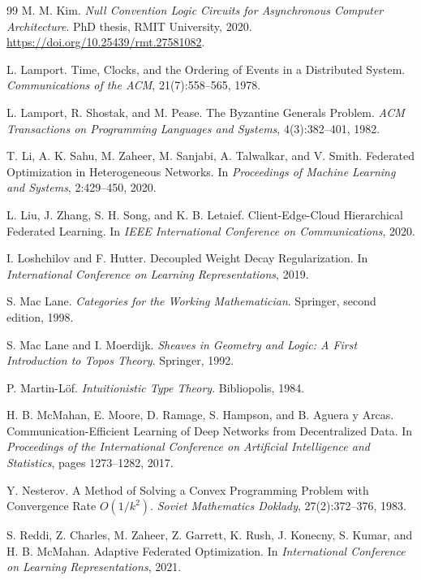 \documentclass[11pt]{article}
\theoremstyle{definition}
\theoremstyle{remark}
\begin{document}
\begin{thebibliography}{99}
M. M. Kim.
\newblock \emph{Null Convention Logic Circuits for Asynchronous Computer Architecture}.
\newblock PhD thesis, RMIT University, 2020.
\newblock \url{https://doi.org/10.25439/rmt.27581082}.

L. Lamport.
\newblock Time, Clocks, and the Ordering of Events in a Distributed System.
\newblock \emph{Communications of the ACM}, 21(7):558--565, 1978.

L. Lamport, R. Shostak, and M. Pease.
\newblock The Byzantine Generals Problem.
\newblock \emph{ACM Transactions on Programming Languages and Systems}, 4(3):382--401, 1982.

T. Li, A. K. Sahu, M. Zaheer, M. Sanjabi, A. Talwalkar, and V. Smith.
\newblock Federated Optimization in Heterogeneous Networks.
\newblock In \emph{Proceedings of Machine Learning and Systems}, 2:429--450, 2020.

L. Liu, J. Zhang, S. H. Song, and K. B. Letaief.
\newblock Client-Edge-Cloud Hierarchical Federated Learning.
\newblock In \emph{IEEE International Conference on Communications}, 2020.

I. Loshchilov and F. Hutter.
\newblock Decoupled Weight Decay Regularization.
\newblock In \emph{International Conference on Learning Representations}, 2019.

S. Mac Lane.
\newblock \emph{Categories for the Working Mathematician}.
\newblock Springer, second edition, 1998.

S. Mac Lane and I. Moerdijk.
\newblock \emph{Sheaves in Geometry and Logic: A First Introduction to Topos Theory}.
\newblock Springer, 1992.

P. Martin-L\"of.
\newblock \emph{Intuitionistic Type Theory}.
\newblock Bibliopolis, 1984.

H. B. McMahan, E. Moore, D. Ramage, S. Hampson, and B. Aguera y Arcas.
\newblock Communication-Efficient Learning of Deep Networks from Decentralized Data.
\newblock In \emph{Proceedings of the International Conference on Artificial Intelligence and Statistics}, pages 1273--1282, 2017.

Y. Nesterov.
\newblock A Method of Solving a Convex Programming Problem with Convergence Rate $O(1/k^2)$.
\newblock \emph{Soviet Mathematics Doklady}, 27(2):372--376, 1983.

S. Reddi, Z. Charles, M. Zaheer, Z. Garrett, K. Rush, J. Konecny, S. Kumar, and H. B. McMahan.
\newblock Adaptive Federated Optimization.
\newblock In \emph{International Conference on Learning Representations}, 2021.


\end{thebibliography}
\end{document}
